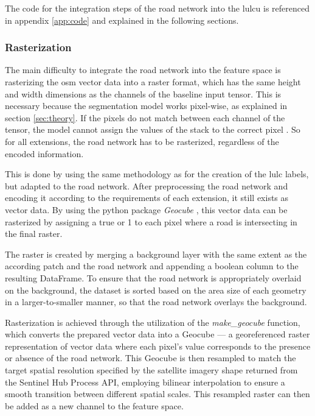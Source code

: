 The code for the integration steps of the road network into the \gls{lulcu} is referenced in appendix \ref{app:code} and explained in the following sections.

\subsubsection*{Rasterization}

The main difficulty to integrate the road network into the feature space is rasterizing the \gls{osm} vector data into a raster format, which has the same height and width dimensions as the channels of the baseline input tensor. This is necessary because the segmentation model works pixel-wise, as explained in section \ref{sec:theory}. If the pixels do not match between each channel of the tensor, the model cannot assign the values of the stack to the correct pixel \autocite{Dosovitskiy.Beyer.ea2020,Goodfellow.Bengio.ea2016}. So for all extensions, the road network has to be rasterized, regardless of the encoded information.

This is done by using the same methodology as for the creation of the \gls{lulc} labels, but adapted to the road network. After preprocessing the road network and encoding it according to the requirements of each extension, it still exists as vector data. By using the python package \emph{Geocube} \autocite{CortevaAgriscience2024}, this vector data can be rasterized by assigning a true or 1 to each pixel where a road is intersecting in the final raster. 

The raster is created by merging a background layer with the same extent as the according patch and the road network and appending a boolean column to the resulting DataFrame. To ensure that the road network is appropriately overlaid on the background, the dataset is sorted based on the area size of each geometry in a larger-to-smaller manner, so that the road network overlays the background.

Rasterization is achieved through the utilization of the \emph{make\_geocube} function, which converts the prepared vector data into a Geocube — a georeferenced raster representation of vector data where each pixel's value corresponds to the presence or absence of the road network. This Geocube is then resampled to match the target spatial resolution specified by the satellite imagery shape returned from the Sentinel Hub Process API, employing bilinear interpolation to ensure a smooth transition between different spatial scales. This resampled raster can then be added as a new channel to the feature space.

